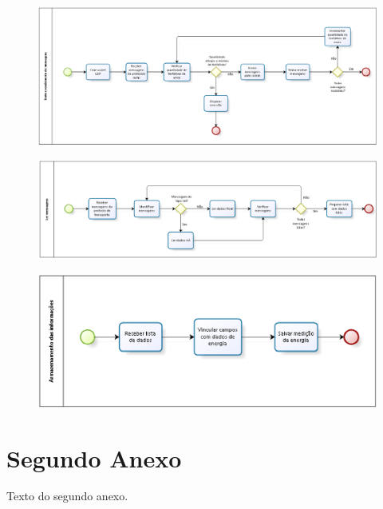 \begin{anexosenv}
\begin{figure}[!h]
    \centering
    \includegraphics[keepaspectratio=true,scale=0.7,angle=90]{figuras/process_5.eps}
    \caption{}
    \label{process_5}
\end{figure}

\begin{figure}[!h]
    \centering
    \includegraphics[keepaspectratio=true,scale=0.7,angle=90]{figuras/process_6.eps}
    \caption{}
    \label{process_6}
\end{figure}

\begin{figure}[!h]
    \centering
    \includegraphics[keepaspectratio=true,scale=1.0]{figuras/process_7.eps}
    \caption{}
    \label{process_7}
\end{figure}

\chapter{Segundo Anexo}

Texto do segundo anexo.

\end{anexosenv}

